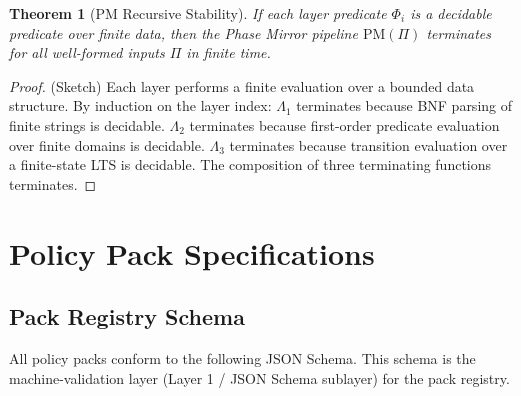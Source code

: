 \documentclass[12pt,letterpaper]{article}
\theoremstyle{definition}
\theoremstyle{plain}
\newtheorem{theorem}{Theorem}[section]
\theoremstyle{remark}
\begin{document}
\begin{theorem}[PM Recursive Stability]
If each layer predicate $\Phi_i$ is a decidable predicate over finite data, then
the Phase Mirror pipeline $\text{PM}(\Pi)$ terminates for all well-formed inputs
$\Pi$ in finite time.
\end{theorem}

\begin{proof}
(Sketch) Each layer performs a finite evaluation over a bounded data structure.
By induction on the layer index: $\Lambda_1$ terminates because BNF parsing of
finite strings is decidable. $\Lambda_2$ terminates because first-order predicate
evaluation over finite domains is decidable. $\Lambda_3$ terminates because
transition evaluation over a finite-state LTS is decidable. The composition
of three terminating functions terminates.
\end{proof}

\section{Policy Pack Specifications}
\label{sec:packs}

\subsection{Pack Registry Schema}

All policy packs conform to the following JSON Schema. This schema is the
machine-validation layer (Layer 1 / JSON Schema sublayer) for the pack registry.
\end{document}

